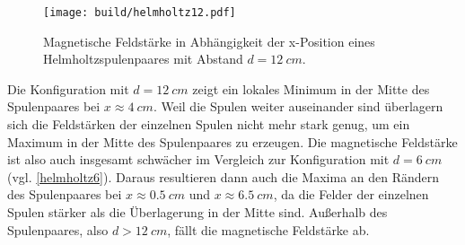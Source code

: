 \begin{figure}[H]
    \texttt{[image: build/helmholtz12.pdf]}
    \caption{Magnetische Feldstärke in Abhängigkeit der x-Position eines Helmholtzspulenpaares mit Abstand $d =\SI{12}{cm}$.}
    \label{helmholtz12}
\end{figure}
Die Konfiguration mit $d = \SI{12}{cm}$ zeigt ein lokales Minimum in der Mitte des Spulenpaares bei $x \approx \SI{4}{cm}$. Weil die Spulen weiter auseinander sind
überlagern sich die Feldstärken der einzelnen Spulen nicht mehr stark genug, um ein Maximum in der Mitte des Spulenpaares zu erzeugen. Die magnetische Feldstärke ist also auch insgesamt schwächer im Vergleich zur Konfiguration mit $d = \SI{6}{cm}$ (vgl. \autoref{helmholtz6}).
Daraus resultieren dann auch die Maxima an den Rändern des Spulenpaares bei $x \approx \SI{0.5}{cm}$ und $x \approx \SI{6.5}{cm}$, da die Felder der einzelnen Spulen stärker als die Überlagerung in der Mitte sind. Außerhalb des Spulenpaares, also $d > \SI{12}{cm}$, fällt die 
magnetische Feldstärke ab.

